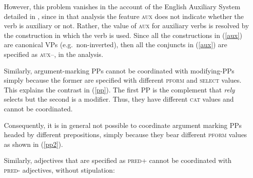 \documentclass[output=paper
                ,modfonts
                ,nonflat
	        ,collection
	        ,collectionchapter
	        ,collectiontoclongg
 	        ,biblatex
                ,babelshorthands
                ,newtxmath
                ,draftmode
                ,colorlinks, citecolor=brown
]{./langsci/langscibook}
\begin{document}
\noindent
However, this problem vanishes in the account of the English Auxiliary System detailed in \citet{SagEtAl20}, since in that analysis
the feature \textsc{aux} does not indicate whether the verb is auxiliary or not. Rather, the value of \textsc{aux} for auxiliary verbs is resolved by the construction in which the verb is used. Since all the constructions in (\ref{aux}) are canonical VPs (e.g.\ non-inverted), then 
all the conjuncts in (\ref{aux}) are specified as \textsc{aux--}, in
the \citet{SagEtAl20} analysis.




Similarly, argument-marking PPs cannot be coordinated with modifying-PPs simply because the former are specified with different  \textsc{pform} and \textsc{select} values. This explains the contrast
in (\ref{pp}). The first PP is the complement that \emph{rely}
selects but the second is a modifier. Thus, they have different \textsc{cat} values and cannot be coordinated.


\begin{exe}
\ex
\begin{xlista}
\end{xlista}\label{pp}
\end{exe}

\noindent
Consequently, it is in general not possible to coordinate argument marking PPs headed by different prepositions, simply because they bear
different \textsc{pform} values as shown in (\ref{pp2}).

\begin{exe}
\ex
\begin{xlista}

\end{xlista}\label{pp2}
\end{exe}

Similarly, adjectives that are specified as \textsc{pred+} cannot be
coordinated with  \textsc{pred-} adjectives, without stipulation:

\begin{exe}
\ex
\begin{xlista}
 \end{xlista}
\end{exe}
\end{document}
